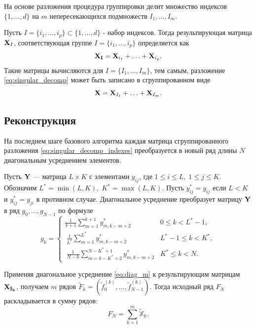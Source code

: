 \documentclass[specialist, substylefile = spbu.rtx,
			   subf, href, 12pt]{disser}
\begin{document}
На основе разложения процедура группировки делит множество индексов \newline $\{1, \dotsc, d\}$ на $m$ непересекающихся подмножеств $I_1, \dotsc, I_m$.

Пусть $I = \{i_1, \dotsc, i_p\} \subset \{1, \dotsc, d\}$ - набор индексов. Тогда результирующая матрица $\bold{X}_I$, соответствующая группе $I = \{i_1, \dotsc, i_p\}$ определяется как 
$$\bold{X_I} = \bold{X}_{i_1} + \dotsc + \bold{X}_{i_p}.$$
Такие матрицы вычисляются для $I = \{I_1, \dotsc, I_m\}$, тем самым, разложение \eqref{eq:singular_decomp} может быть записано в сгруппированном виде
\begin{equation}\label{eq:singular_decomp_indexes}
	\bold{X} = \bold{X}_{I_1} + \dotsc + \bold{X}_{I_m}.
\end{equation}

\subsection{Реконструкция}

На последнем шаге базового алгоритма каждая матрица сгруппированного разложения \eqref{eq:singular_decomp_indexes} преобразуется в новый ряд длины $ N $ диагональным усреднением элементов.

Пусть $\bold{Y}$ --- матрица $L \times K$ с элементами $y_{ij}$, где $1 \leq i \leq L,\; 1 \leq j \leq K$. Обозначим $L^* = \min(L, K), \; K^* = \max(L, K)$. Пусть $y_{ij}^* = y_{ij}$ если $L<K$ и $y_{ij}^* = y_{ji}$ в противном случае. Диагональное усреднение преобразует матрицу $\bold{Y}$ в ряд $g_0, \dotsc, g_{N-1}$ по формуле
\begin{equation}\label{eq:diag_m}
	g_k = 
	\begin{cases}
		\frac{1}{k+1}\sum\limits_{m=1}^{k+1}y_{m, k-m+2}^* & 0 \leq k < L^* -1, \\\
		\frac{1}{L^*}\sum\limits_{m=1}^{L^*}y_{m, k-m+2}^* & L^* - 1 \leq k < K^*, \\\
		\frac{1}{N-k}\sum\limits_{m=k - K^* + 2}^{N - K^* + 1}y_{m, k-m+2}^* & K^* \leq k < N.
	\end{cases}
\end{equation}

Применяя диагональное усреднение \eqref{eq:diag_m} к результирующим матрицам $\bold{X_{I_k}}$, получаем $m$ рядов $\widetilde{F}_{k} = (\widetilde{f}_0^{(k)}, \dotsc, \widetilde{f}_{N-1}^{(k)})$. Тогда исходный ряд $F_N$ раскладывается в сумму рядов:
$$F_N = \sum\limits_{k=1}^{m}\widetilde{\mathbb{X}}_k.$$
\end{document}
